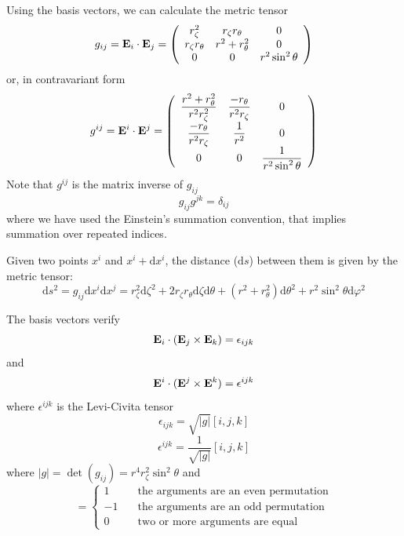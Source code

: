 Using the basis vectors, we can calculate the metric tensor
\begin{equation}
g_{ij}=\mathbf{E}_i\cdot\mathbf{E}_j=\left(
\begin{array}{ccc}
r_\zeta^2&r_\zeta r_\theta&0\\
r_\zeta r_\theta&r^2+r_\theta^2&0\\
0&0&r^2\sin^2\theta
\end{array}
\right)
\end{equation}
or, in contravariant form
\begin{equation}
g^{ij}=\mathbf{E}^i\cdot\mathbf{E}^j=\left(
\begin{array}{ccc}
\displaystyle\frac{r^2+r_\theta^2}{r^2r_\zeta^2}&\displaystyle\frac{-r_\theta}{r^2r_\zeta}&0\\
\displaystyle\frac{-r_\theta}{r^2r_\zeta}&\displaystyle\frac{1}{r^2}&0\\
0&0&\displaystyle\frac{1}{r^2\sin^2\theta}
\end{array}
\right)
\end{equation}
Note that $g^{ij}$ is the matrix inverse of $g_{ij}$
$$g_{ij}g^{jk}=\delta_{ij}$$
where we have used the Einstein's summation convention, that implies summation over repeated indices.

Given two points $x^i$ and $x^i+\mathrm{d}x^i$, the distance ($\mathrm{d}s$) between them 
is given by the metric tensor:
\begin{equation}
\mathrm{d}s^2=g_{ij}\mathrm{d}x^i\mathrm{d}x^j=
r_\zeta^2\mathrm{d}\zeta^2+2r_\zeta r_\theta \mathrm{d}\zeta \mathrm{d}\theta+
(r^2+r_\theta^2)\mathrm{d}\theta^2+r^2\sin^2\theta \mathrm{d}\varphi^2
\end{equation}

The basis vectors verify
\begin{equation}
\mathbf{E}_i\cdot(\mathbf{E}_j\times\mathbf{E}_k)=\epsilon_{ijk}
\end{equation}
and
\begin{equation}
\mathbf{E}^i\cdot(\mathbf{E}^j\times\mathbf{E}^k)=\epsilon^{ijk}
\end{equation}
where $\epsilon^{ijk}$ is the Levi-Civita tensor
\begin{equation}
\epsilon_{ijk}=\sqrt{|g|}[i,j,k]
\end{equation}
\begin{equation}
\epsilon^{ijk}=\frac{1}{\sqrt{|g|}}[i,j,k]
\end{equation}
where $|g|=\det(g_{ij})=r^4r_\zeta^2\sin^2\theta$ and
\begin{equation}
[i,j,k]=\left\{
\begin{array}{ll}
1&\quad\mbox{the arguments are an even permutation}\\
-1&\quad\mbox{the arguments are an odd permutation}\\
0&\quad\mbox{two or more arguments are equal}
\end{array}
\right.
\end{equation}


